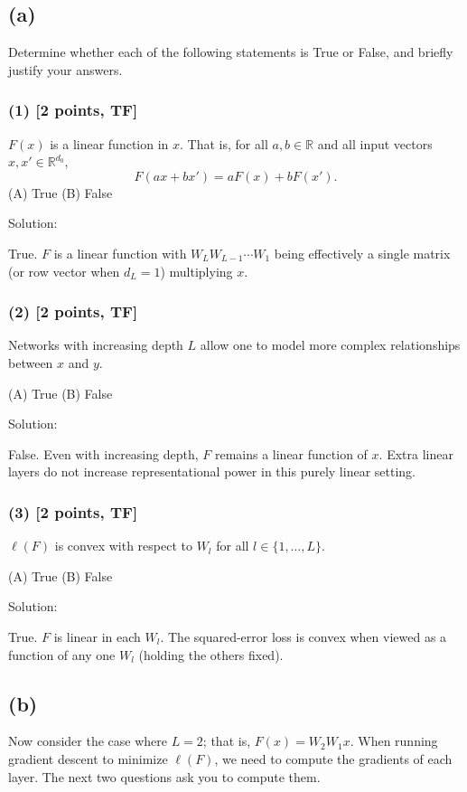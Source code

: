 \documentclass[twocolumn]{article}
\begin{document}
\begin{spacing}{1}
\subsection*{(a)}
Determine whether each of the following statements is True or False, and briefly justify your answers.

\subsubsection*{(1) [2 points, TF]}
\(F(x)\) is a linear function in \(x.\) That is, for all \(a, b \in \mathbb{R}\) and all input vectors \(x, x' \in \mathbb{R}^{d_0}\),
\[
F(ax + bx') = a F(x) + b F(x').
\]
(A) True \quad (B) False

Solution:

True. \(F\) is a linear function with \(W_L W_{L-1} \cdots W_1\) being effectively a single matrix (or row vector when \(d_L=1\)) multiplying \(x\).

\subsubsection*{(2) [2 points, TF]}
Networks with increasing depth \(L\) allow one to model more complex relationships between \(x\) and \(y\).

(A) True \quad (B) False

Solution:

False. Even with increasing depth, \(F\) remains a linear function of \(x\). Extra linear layers do not increase representational power in this purely linear setting.

\subsubsection*{(3) [2 points, TF]}
\(\ell(F)\) is convex with respect to \(W_l\) for all \(l \in \{1,\ldots,L\}\).

(A) True \quad (B) False

Solution:

True. \(F\) is linear in each \(W_l\). The squared-error loss is convex when viewed as a function of any one \(W_l\) (holding the others fixed).

\subsection*{(b)}
Now consider the case where \(L=2\); that is, \(F(x) = W_2 W_1 x.\) When running gradient descent to minimize \(\ell(F)\), we need to compute the gradients of each layer. The next two questions ask you to compute them.


\end{spacing}
\end{document}
